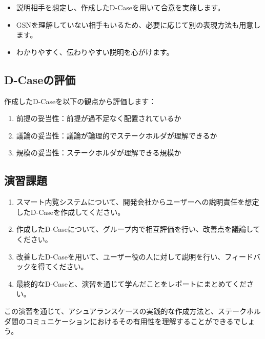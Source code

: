 \begin{itemize}
    \item 説明相手を想定し、作成したD-Caseを用いて合意を実施します。
    \item GSNを理解していない相手もいるため、必要に応じて別の表現方法も用意します。
    \item わかりやすく、伝わりやすい説明を心がけます。
\end{itemize}

\subsection{D-Caseの評価}

作成したD-Caseを以下の観点から評価します：

\begin{enumerate}
    \item 前提の妥当性：前提が過不足なく配置されているか
    \item 議論の妥当性：議論が論理的でステークホルダが理解できるか
    \item 規模の妥当性：ステークホルダが理解できる規模か
\end{enumerate}

\subsection{演習課題}

\begin{enumerate}
    \item スマート内覧システムについて、開発会社からユーザーへの説明責任を想定したD-Caseを作成してください。
    \item 作成したD-Caseについて、グループ内で相互評価を行い、改善点を議論してください。
    \item 改善したD-Caseを用いて、ユーザー役の人に対して説明を行い、フィードバックを得てください。
    \item 最終的なD-Caseと、演習を通じて学んだことをレポートにまとめてください。
\end{enumerate}

この演習を通じて、アシュアランスケースの実践的な作成方法と、ステークホルダ間のコミュニケーションにおけるその有用性を理解することができるでしょう。


